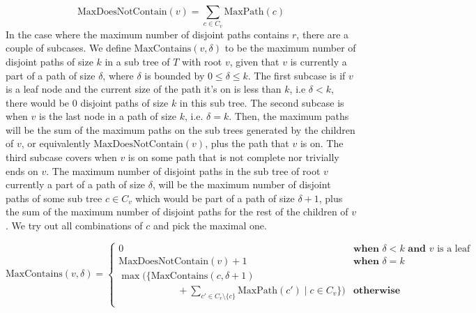 \documentclass[11pt]{scrartcl}
\newcommand{\maxp}{\text{MaxPath}}
\newcommand{\ctn}{\text{MaxContains}}
\newcommand{\dctn}{\text{MaxDoesNotContain}}
\begin{document}
$$
	\dctn(v) = \sum_{c \in C_v } \maxp(c)
$$
In the case where the maximum number of disjoint paths contains $r$, there are a couple of subcases.
We define $\ctn(v,\delta)$ to be the maximum number of disjoint paths of size $k$
in a sub tree of $T$ with root $v$, given that
$v$ is currently a part of a path of size $\delta$, where $\delta$ is bounded by $0 \leq \delta \leq k$.
The first subcase is if $v$ is a leaf node and the current size of the path it's on is less than $k$,
i.e $\delta < k$, there would be $0$ disjoint paths of size $k$ in this sub tree.
The second subcase is when $v$ is the last node in a path of size $k$, i.e. $\delta = k$. Then, the
maximum paths will be the sum of the maximum paths on the sub trees generated by the children of
$v$, or equivalently $\dctn(v)$, plus the path that $v$ is on.
The third subcase covers when $v$ is on some path that is not complete nor trivially ends on $v$.
The maximum number of disjoint paths in the sub tree of root $v$ currently a part of a path of size $\delta$,
will be the maximum number of disjoint paths of some sub tree $c \in C_v$ which would be
part of a path of size $\delta + 1$, plus the sum of the maximum number of disjoint paths for
the rest of the children of $v$. We try out all combinations of $c$ and pick the maximal one.

$$
	\ctn(v,\delta) =
	\begin{cases}
		0            & \textbf{when } \delta < k \textbf{ and } v \text{ is a leaf} \\
		\dctn(v) + 1 & \textbf{when } \delta = k                                    \\
		\max\bigg(\Big\{
		\ctn(c,\delta + 1)                                                          \\
		\qquad \qquad \qquad
		+ \displaystyle\sum_{c' \in C_v \setminus \{c\}} \maxp(c') \mid c \in C_v
		\Big\}\bigg) & \textbf{otherwise}                                           \\
	\end{cases}
$$
\end{document}
